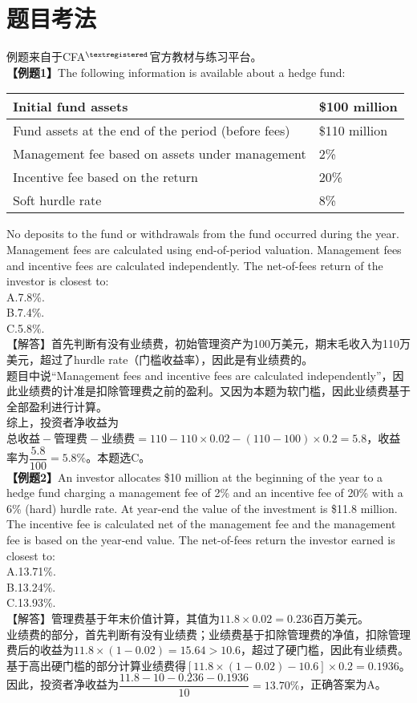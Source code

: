 \documentclass[UTF8]{article}
\begin{document}
\section{题目考法}
例题来自于CFA\(^{\textregistered}\)官方教材与练习平台。\\
\indent \textbf{【例题1】}The following information is available about a hedge fund:\\
\begin{center}
\begin{tabular}{|m{5cm}|m{4cm}|} \hline
Initial fund assets & \$100 million \\ \hline
Fund assets at the end of the period (before fees)& \$110 million \\ \hline
Management fee based on assets under management& 2\% \\ \hline
Incentive fee based on the return& 20\% \\ \hline
Soft hurdle rate& 8\% \\ \hline
\end{tabular}
\end{center}
\indent No deposits to the fund or withdrawals from the fund occurred during the year. Management fees are calculated using end-of-period valuation. Management fees and incentive fees are calculated independently. The net-of-fees return of the investor is closest to: \\
\indent A.7.8\%.\\
\indent B.7.4\%.\\
\indent C.5.8\%.\\
\indent 【解答】首先判断有没有业绩费，初始管理资产为100万美元，期末毛收入为110万美元，超过了hurdle rate（门槛收益率），因此是有业绩费的。\\
\indent 题目中说“Management fees and incentive fees are calculated independently”，因此业绩费的计准是扣除管理费之前的盈利。又因为本题为软门槛，因此业绩费基于全部盈利进行计算。\\
\indent 综上，投资者净收益为\(\text{总收益}-\text{管理费}-\text{业绩费}=110-110\times0.02-(110-100)\times0.2=5.8\)，收益率为\(\dfrac{5.8}{100}=5.8\%\)。本题选C。\\
\indent \textbf{【例题2】}An investor allocates \$10 million at the beginning of the year to a hedge fund charging a management fee of 2\% and an incentive fee of 20\% with a 6\% (hard) hurdle rate. At year-end the value of the investment is \$11.8 million. The incentive fee is calculated net of the management fee and the management fee is based on the year-end value. The net-of-fees return the investor earned is closest to: \\
\indent A.13.71\%. \\
\indent B.13.24\%. \\
\indent C.13.93\%. \\
\indent 【解答】管理费基于年末价值计算，其值为\(11.8\times0.02=0.236\)百万美元。\\
\indent 业绩费的部分，首先判断有没有业绩费；业绩费基于扣除管理费的净值，扣除管理费后的收益为\(11.8\times(1-0.02)=15.64>10.6\)，超过了硬门槛，因此有业绩费。基于高出硬门槛的部分计算业绩费得\([11.8\times(1-0.02)-10.6]\times0.2=0.1936\)。因此，投资者净收益为\(\dfrac{11.8-10-0.236-0.1936}{10}=13.70\%\)，正确答案为A。
\end{document}
